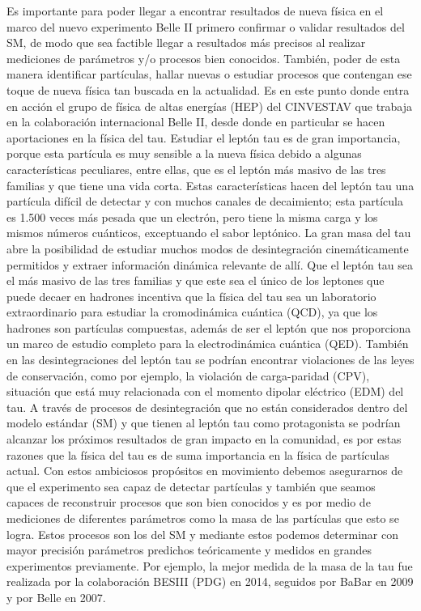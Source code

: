Es importante para poder llegar a encontrar resultados de nueva física en el marco del nuevo experimento Belle II primero confirmar o validar resultados del SM, de modo que sea factible llegar a resultados más precisos al realizar mediciones de parámetros y/o procesos bien conocidos. También, poder de esta manera identificar partículas, hallar nuevas o estudiar procesos que contengan ese toque de nueva física tan buscada en la actualidad. Es en este punto donde entra en acción el grupo de física de altas energías (HEP) del CINVESTAV que trabaja en la colaboración internacional Belle II, desde donde en particular se hacen aportaciones en la física del tau. Estudiar el leptón tau es de gran importancia, porque esta partícula es muy sensible a la nueva física debido a algunas características peculiares, entre ellas, que es el leptón más masivo de las tres familias y que tiene una vida corta. Estas características hacen del leptón tau una partícula difícil de detectar y con muchos canales de decaimiento; esta partícula es 1.500 veces más pesada que un electrón, pero tiene la misma carga y los mismos números cuánticos, exceptuando el sabor leptónico.
La gran masa del tau abre la posibilidad de estudiar muchos modos de desintegración cinemáticamente permitidos y extraer información dinámica relevante de allí. Que el leptón tau sea el más masivo de las tres familias y que este sea el único de los leptones que puede decaer en hadrones incentiva que la física del tau sea un laboratorio extraordinario  para estudiar la cromodinámica cuántica (QCD), ya que los hadrones son partículas compuestas, además de ser el leptón que nos proporciona un marco de estudio completo para la electrodinámica cuántica (QED). También en las desintegraciones del leptón tau se podrían encontrar violaciones de las leyes de conservación, como por ejemplo, la violación de carga-paridad (CPV), situación que está muy relacionada con el momento dipolar eléctrico (EDM) del tau. A través de procesos de desintegración que no están considerados dentro del modelo estándar (SM) y que tienen al leptón tau como protagonista se podrían alcanzar los próximos resultados de gran impacto en la comunidad, es por estas razones que la física del tau es de suma importancia en la física de partículas actual. Con estos ambiciosos propósitos en movimiento debemos asegurarnos de que el experimento sea capaz de detectar partículas y también que seamos capaces de reconstruir procesos que son bien conocidos y es por medio de mediciones de diferentes parámetros como la masa de las partículas que esto se logra. Estos procesos son los del SM y mediante estos podemos determinar con mayor precisión parámetros predichos teóricamente y medidos en grandes experimentos previamente. Por ejemplo, la mejor medida de la masa de la tau fue realizada por la colaboración BESIII \cite{PhysRevD.90.012001} (PDG) en 2014, seguidos por BaBar \cite{Aubert_2009} en 2009 y por Belle \cite{PhysRevLett.99.011801} en 2007.


